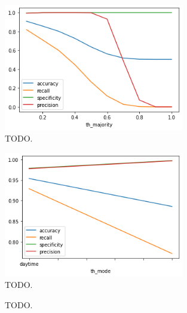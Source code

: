 \begin{figure}
    \centering
    \includegraphics[width=0.7\textwidth]{res/res-th-majority}
    \caption{TODO.}
    \label{fig:res-th-majority}
\end{figure}

\begin{figure}
    \centering
    \includegraphics[width=0.7\textwidth]{res/res-th-mode}
    \caption{TODO.}
    \label{fig:res-th-mode}
\end{figure}

\begin{figure}
    \centering
    \caption{TODO.}
    \label{fig:res-th-multiplier}
\end{figure}

